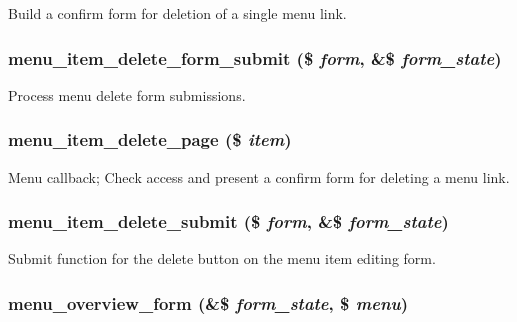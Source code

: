 Build a confirm form for deletion of a single menu link. \hypertarget{menu_8admin_8inc_68d6f7a22501af5a1e4864996008c0b7}{
\subsubsection[{menu\_\-item\_\-delete\_\-form\_\-submit}]{\setlength{\rightskip}{0pt plus 5cm}menu\_\-item\_\-delete\_\-form\_\-submit (\$ {\em form}, \/  \&\$ {\em form\_\-state})}}
\label{menu_8admin_8inc_68d6f7a22501af5a1e4864996008c0b7}


Process menu delete form submissions. \hypertarget{menu_8admin_8inc_2aaea348b520cd9c44792983f1749cfa}{
\subsubsection[{menu\_\-item\_\-delete\_\-page}]{\setlength{\rightskip}{0pt plus 5cm}menu\_\-item\_\-delete\_\-page (\$ {\em item})}}
\label{menu_8admin_8inc_2aaea348b520cd9c44792983f1749cfa}


Menu callback; Check access and present a confirm form for deleting a menu link. \hypertarget{menu_8admin_8inc_a0ab9f4cce0d1ece6c2151ad212e81f9}{
\subsubsection[{menu\_\-item\_\-delete\_\-submit}]{\setlength{\rightskip}{0pt plus 5cm}menu\_\-item\_\-delete\_\-submit (\$ {\em form}, \/  \&\$ {\em form\_\-state})}}
\label{menu_8admin_8inc_a0ab9f4cce0d1ece6c2151ad212e81f9}


Submit function for the delete button on the menu item editing form. \hypertarget{menu_8admin_8inc_cddf1ae47e6d4796c437447fd1a1a88e}{
\subsubsection[{menu\_\-overview\_\-form}]{\setlength{\rightskip}{0pt plus 5cm}menu\_\-overview\_\-form (\&\$ {\em form\_\-state}, \/  \$ {\em menu})}}
\label{menu_8admin_8inc_cddf1ae47e6d4796c437447fd1a1a88e}


